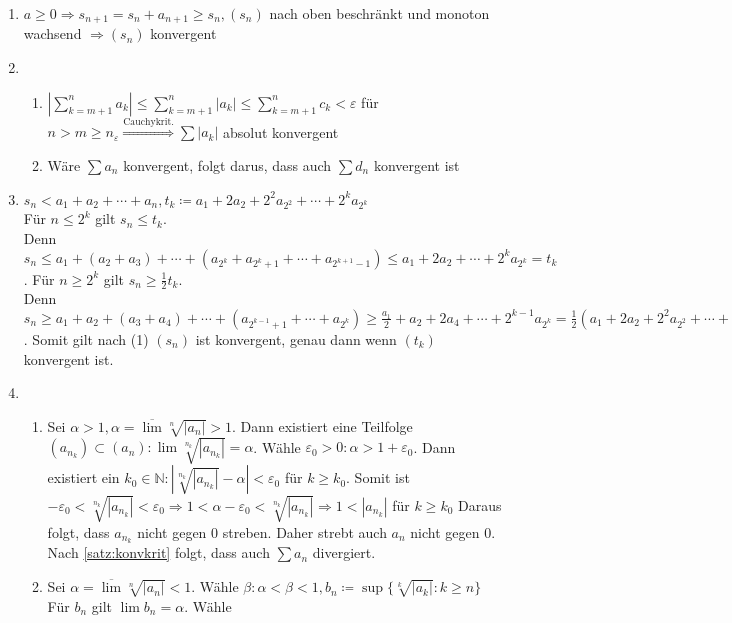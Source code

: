 \documentclass[ngerman,titlepage,twoside, parskip=half*]{scrreprt}
\newcommand*{\N}{\mathbb{N}}
\theoremstyle{plain}
\theoremstyle{definition}
\theoremstyle{remark}
\begin{document}
\begin{enumerate}[(1)]
  \item $a\geq 0 \Rightarrow s_{n+1}=s_n+a_{n+1} \geq s_n, (s_n)$ nach oben beschränkt und monoton wachsend $\Rightarrow (s_n)$
    konvergent
  \item
    \begin{enumerate}[1)]
      \item $|\sum_{k=m+1}^n a_k|\leq \sum_{k=m+1}^n |a_k|\leq \sum_{k=m+1}^n c_k <\varepsilon$ für $n>m\geq n_{\varepsilon}
        \stackrel{\text{Cauchykrit.}}{\Longrightarrow} \sum |a_k|$ absolut konvergent
      \item Wäre $\sum a_n$ konvergent, folgt darus, dass auch $\sum d_n$ konvergent ist
    \end{enumerate}
  \item $s_n<a_1+a_2+\cdots +a_n, t_k\coloneqq a_1+2a_2+2^2a_{2^2}+\cdots +2^ka_{2^k}$\\
    Für $n\leq 2^k$ gilt $s_n\leq t_k$.\\
    Denn $s_n\leq a_1+(a_2+a_3)+\cdots +(a_{2^k}+a_{2^k+1}+\cdots +a_{2^{k+1}-1})\leq
    a_1+2a_2+\cdots +2^ka_{2^k}=t_k$. Für $n\geq 2^k$ gilt $s_n\geq \frac{1}{2}t_k$.\\
    Denn $s_n\geq a_1 + a_2+(a_3+a_4)+\cdots +(a_{2^{k-1}+1}+\cdots +a_{2^k})\geq \frac{a_1}{2}+a_2+2a_4+\cdots +2^{k-1}
    a_{2^k}=\frac{1}{2}(a_1+2a_2+2^2a_{2^2}+\cdots +2^ka_{2^k})=\frac{1}{2}t_k$. Somit gilt nach (1) $(s_n)$ ist
    konvergent, genau dann wenn $(t_k)$ konvergent ist.
  \item
    \begin{enumerate}[1. F{a}ll]
      \item Sei $\alpha >1, \alpha=\overline{\lim}\sqrt[n]{|a_n|}>1$. Dann existiert eine Teilfolge $(a_{n_k}) \subset (a_n)\colon
        \lim \sqrt[n_k]{|a_{n_k}|}=\alpha$. Wähle $\varepsilon_0>0\colon\alpha >1+\varepsilon_0$. Dann existiert ein $k_0 \in \N \colon
	|\sqrt[n_k]{|a_{n_k}|}-\alpha |<\varepsilon_0$ für $k\geq k_0$. Somit ist $-\varepsilon_0<\sqrt[n_k]{|a_{n_k}|}<
	\varepsilon_0 \Rightarrow 1<\alpha-\varepsilon_0<\sqrt[n_k]{|a_{n_k}|}\Rightarrow 1<|a_{n_k}|$ für $k\geq k_0$
	Daraus folgt, dass $a_{n_k}$ nicht gegen 0 streben. Daher strebt auch $a_n$ nicht gegen 0. Nach \autoref{satz:konvkrit}
	folgt, dass auch $\sum a_n$ divergiert.
      \item Sei $\alpha =\overline{\lim}\sqrt[n]{|a_n|}<1$. Wähle $\beta \colon\alpha<\beta <1, b_n\coloneqq\sup\{\sqrt[k]{|a_k|}\colon k\geq n\}$
        Für $b_n$ gilt $\lim b_n=\alpha$. Wähle

\end{enumerate}
\end{enumerate}
\end{document}
